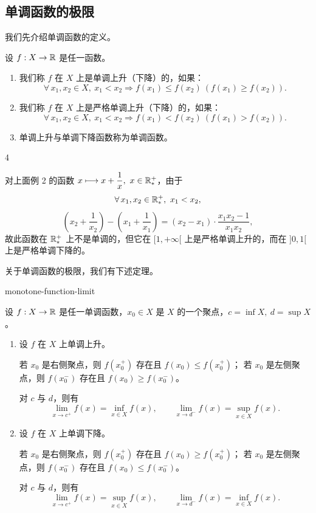\subsection{单调函数的极限}
	\label{sec:4-4-2}

我们先介绍单调函数的定义。

\begin{mydef*}{}

	设 \(f:X\to\mathbb{R}\) 是任一函数。

	\begin{enumerate}[label=\arabic*)]
		\item 我们称 \(f\) 在 \(X\) 上是单调上升（下降）的，如果：
		\[
		\forall\,x_1,x_2\in X,\ x_1<x_2\Longrightarrow f(x_1)\le f(x_2)\ (f(x_1)\ge f(x_2)).
		\]
		\item 我们称 \(f\) 在 \(X\) 上是严格单调上升（下降）的，如果：
		\[
		\forall\,x_1,x_2\in X,\ x_1<x_2\Longrightarrow f(x_1)<f(x_2)\ (f(x_1)>f(x_2)).
		\]
		\item 单调上升与单调下降函数称为单调函数。
	\end{enumerate}

\end{mydef*}

\begin{sourceexample}{4}

	对上面例 2 的函数 \(x\longmapsto x+\dfrac1x,\ x\in\mathbb{R}^+_*\)，由于
	\[
	\forall\,x_1,x_2\in\mathbb{R}^+_*,\ x_1<x_2,
	\]
	\[
	\left(x_2+\frac1{x_2}\right)-\left(x_1+\frac1{x_1}\right)=(x_2-x_1)\cdot\frac{x_1x_2-1}{x_1x_2},
	\]
	故此函数在 \(\mathbb{R}^+_*\) 上不是单调的，但它在 \([1,+\infty[\) 上是严格单调上升的，而在 \(]0,1[\) 上是严格单调下降的。

\end{sourceexample}

关于单调函数的极限，我们有下述定理。

\begin{mythm}{}{monotone-function-limit}

	设 \(f:X\to\mathbb{R}\) 是任一单调函数，\(x_0\in X\) 是 \(X\) 的一个聚点，\(c=\inf X,\ d=\sup X\)。

	\begin{enumerate}[label=\arabic*)]
		\item 设 \(f\) 在 \(X\) 上单调上升。

		若 \(x_0\) 是右侧聚点，则 \(f(x_0^+)\) 存在且 \(f(x_0)\le f(x_0^+)\)；
		若 \(x_0\) 是左侧聚点，则 \(f(x_0^-)\) 存在且 \(f(x_0)\ge f(x_0^-)\)。

		对 \(c\) 与 \(d\)，则有
		\[
		\lim_{x\to c^+}f(x)=\inf_{x\in X}f(x),\qquad \lim_{x\to d^-}f(x)=\sup_{x\in X}f(x).
		\]

		\item 设 \(f\) 在 \(X\) 上单调下降。

		若 \(x_0\) 是右侧聚点，则 \(f(x_0^+)\) 存在且 \(f(x_0)\ge f(x_0^+)\)；
		若 \(x_0\) 是左侧聚点，则 \(f(x_0^-)\) 存在且 \(f(x_0)\le f(x_0^-)\)。

		对 \(c\) 与 \(d\)，则有
		\[
		\lim_{x\to c^+}f(x)=\sup_{x\in X}f(x),\qquad \lim_{x\to d^-}f(x)=\inf_{x\in X}f(x).
		\]
	\end{enumerate}

\end{mythm}


